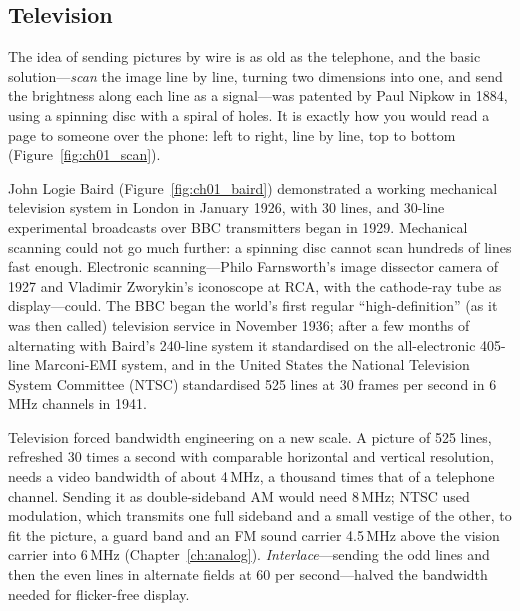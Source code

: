 \subsection{Television}

The idea of sending pictures by wire is as old as the telephone, and the basic solution---\emph{scan}
the image line by line, turning two dimensions into one, and send the brightness along each line as a
signal---was patented by Paul Nipkow in 1884, using a spinning disc with a spiral of holes. It is
exactly how you would read a page to someone over the phone: left to right, line by line, top to
bottom (Figure~\ref{fig:ch01_scan}).


John Logie Baird (Figure~\ref{fig:ch01_baird}) demonstrated a working mechanical television system in
London in January 1926, with 30 lines, and 30-line experimental broadcasts over BBC transmitters began
in 1929. Mechanical scanning could not go much further: a spinning disc cannot scan hundreds of lines
fast enough. Electronic scanning---Philo Farnsworth's image dissector camera of 1927 and Vladimir
Zworykin's iconoscope at RCA, with the cathode-ray tube as display---could. The BBC began the world's
first regular ``high-definition'' (as it was then called) television service in November 1936; after a
few months of alternating with Baird's 240-line system it standardised on the all-electronic 405-line
Marconi-EMI system, and in the United States the National Television System Committee (NTSC)
standardised 525 lines at 30 frames per second in 6\,MHz channels in 1941.

Television forced bandwidth engineering on a new scale. A picture of 525 lines, refreshed 30 times a
second with comparable horizontal and vertical resolution, needs a video bandwidth of about 4\,MHz,
a thousand times that of a telephone channel. Sending it as double-sideband AM would need 8\,MHz;
NTSC used  modulation, which transmits one full sideband and a small vestige
of the other, to fit the picture, a guard band and an FM sound carrier 4.5\,MHz above the vision carrier
into 6\,MHz (Chapter~\ref{ch:analog}). \emph{Interlace}---sending the odd lines and then the even lines
in alternate fields at 60 per second---halved the bandwidth needed for flicker-free display.

